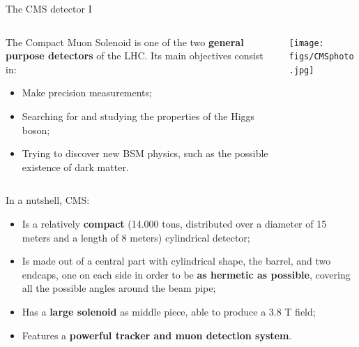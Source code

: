 \documentclass[8pt]{beamer}
\begin{document}
\begin{frame}{The CMS detector I}
\justifying

\begin{columns}
\begin{column}{0.56	\textwidth}
\justifying
The \alert{Compact Muon Solenoid} is one of the two \textbf{general purpose detectors} of the LHC. Its main objectives consist in:
\begin{itemize}
\justifying
\item Make precision measurements;
\item Searching for and studying the properties of the Higgs boson;
\item Trying to discover new BSM physics, such as the possible existence of dark matter.
\end{itemize}
\end{column}
\begin{column}{0.40	\textwidth}
\begin{center}
\texttt{[image: figs/CMSphoto.jpg]}
\end{center}
\end{column}
\end{columns} \vfill

In a nutshell, CMS:
\begin{itemize}
\justifying
\item Is a relatively \textbf{compact} (14.000 tons, distributed over a diameter of 15 meters and a length of 8 meters) cylindrical detector; 
\item Is made out of a central part with cylindrical shape, the barrel, and two endcaps, one on each side in order to be \textbf{as hermetic as possible}, covering all the possible angles around the beam pipe;
\item Has a \textbf{large solenoid} as middle piece, able to produce a 3.8 T field;
\item Features a \textbf{powerful tracker and muon detection system}.
\end{itemize} \vfill
\end{frame}
\end{document}
